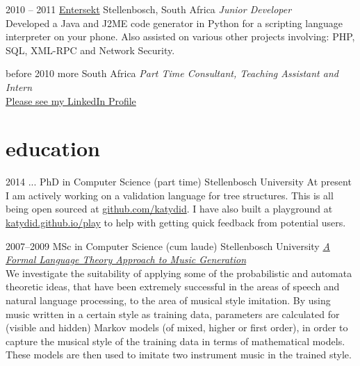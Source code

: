 \documentclass[]{friggeri-cv-a4} %
\begin{document}
\begin{entrylist}
\entry
{2010 -- 2011}
{\href{https://www.entersekt.com/}{Entersekt}}
{Stellenbosch, South Africa}
{\emph{Junior Developer} \\
Developed a Java and J2ME code generator in Python for a scripting language interpreter on your phone.
Also assisted on various other projects involving: PHP, SQL, XML-RPC and Network Security.}

\entry
{before 2010}
{more}
{South Africa}
{\emph{Part Time Consultant, Teaching Assistant and Intern} \\
\href{https://za.linkedin.com/in/schulzewalter}{Please see my LinkedIn Profile}
}

\end{entrylist}

\newpage

\section{education}

\begin{entrylist}

\entry
{2014 ...}
{PhD {\normalfont in Computer Science} (part time)}
{Stellenbosch University}
{At present I am actively working on a validation language for tree structures.
This is all being open sourced at \href{https://github.com/katydid}{github.com/katydid}.
I have also built a playground at \href{https://katydid.github.io/play}{katydid.github.io/play} to help with getting quick feedback from potential users.}

\entry
{2007--2009}
{MSc {\normalfont in Computer Science} (cum laude)}
{Stellenbosch University}
{\href{http://superwillow.sourceforge.net/}{\emph{A Formal Language Theory Approach to Music Generation}} \\ We investigate the suitability of applying some of the probabilistic and automata theoretic ideas, that have been extremely successful in the areas of speech and natural language processing, to the area of musical style imitation. By using music written in a certain style as training data, parameters are calculated for (visible and hidden) Markov models (of mixed, higher or first order), in order to capture the musical style of the training data in terms of mathematical models. These models are then used to imitate two instrument music in the trained style.}

\end{entrylist}
\end{document}
